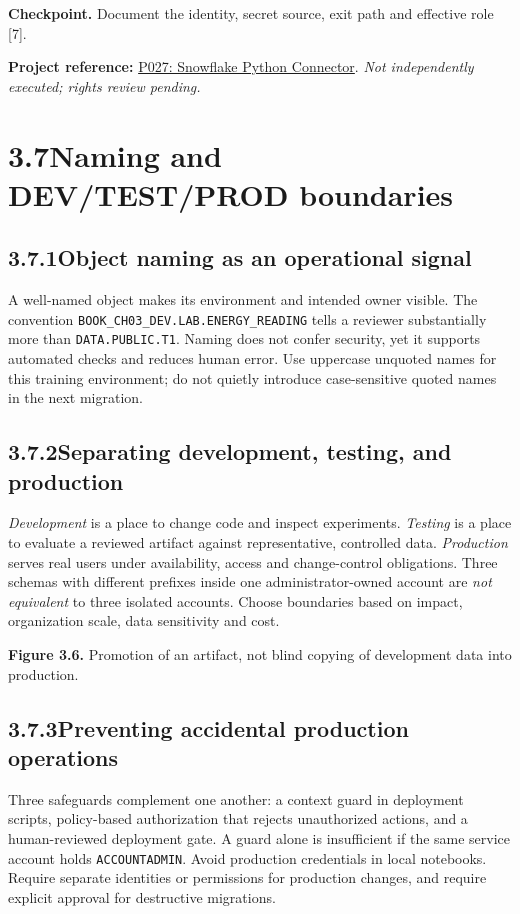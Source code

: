 \documentclass[11pt,twoside]{article}
\newcommand{\topic}[2]{\subsection*{#1\quad #2}}
\newcommand{\repo}[2]{\par\begingroup\fontsize{8.0}{9.6}\selectfont\sffamily\color{inkgray}\textbf{Project reference:} \href{#2}{#1}. \textit{Not independently executed; rights review pending.}\par\endgroup}
\begin{document}
\textbf{Checkpoint.} Document the identity, secret source, exit path and effective role [7].
\repo{P027: Snowflake Python Connector}{https://github.com/snowflakedb/snowflake-connector-python}

\newpage
\section*{3.7\quad Naming and DEV/TEST/PROD boundaries}
\topic{3.7.1}{Object naming as an operational signal}
A well-named object makes its environment and intended owner visible. The convention \texttt{BOOK\_CH03\_DEV.LAB.ENERGY\_READING} tells a reviewer substantially more than \texttt{DATA.PUBLIC.T1}. Naming does not confer security, yet it supports automated checks and reduces human error. Use uppercase unquoted names for this training environment; do not quietly introduce case-sensitive quoted names in the next migration.

\topic{3.7.2}{Separating development, testing, and production}
\emph{Development} is a place to change code and inspect experiments. \emph{Testing} is a place to evaluate a reviewed artifact against representative, controlled data. \emph{Production} serves real users under availability, access and change-control obligations. Three schemas with different prefixes inside one administrator-owned account are \emph{not equivalent} to three isolated accounts. Choose boundaries based on impact, organization scale, data sensitivity and cost.

\begin{center}
\end{center}
{\small\color{inkgray}\textbf{Figure 3.6.} Promotion of an artifact, not blind copying of development data into production.}\par
\topic{3.7.3}{Preventing accidental production operations}
Three safeguards complement one another: a context guard in deployment scripts, policy-based authorization that rejects unauthorized actions, and a human-reviewed deployment gate. A guard alone is insufficient if the same service account holds \texttt{ACCOUNTADMIN}. Avoid production credentials in local notebooks. Require separate identities or permissions for production changes, and require explicit approval for destructive migrations.
\end{document}
